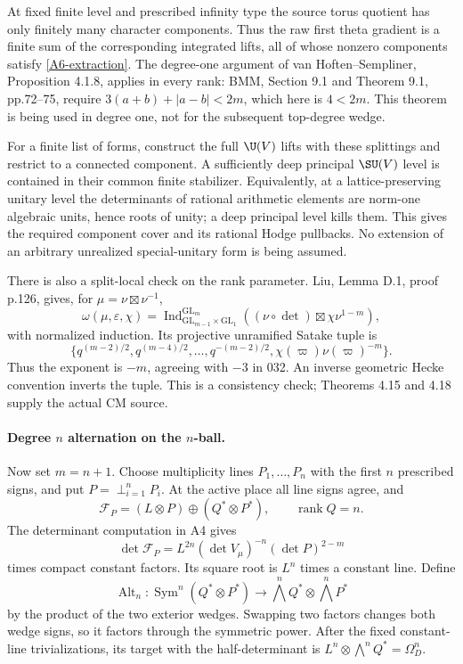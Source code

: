 At fixed finite level and prescribed infinity type the source
torus quotient has only finitely many character components.
Thus the raw first theta gradient is a finite sum of the corresponding
integrated lifts, all of whose nonzero components satisfy
\eqref{A6-extraction}. The degree-one argument of
van Hoften--Sempliner, Proposition 4.1.8, applies in every rank:
BMM, Section 9.1 and Theorem 9.1, pp.72--75, require
$3(a+b)+|a-b|<2m$, which here is $4<2m$. This theorem is being
used in degree one, not for the subsequent top-degree wedge.

For a finite list of forms, construct the full $\U(V)$ lifts with
these splittings and restrict to a connected component. A sufficiently
deep principal $\SU(V)$ level is contained in their common finite
stabilizer. Equivalently, at a lattice-preserving unitary level the
determinants of rational arithmetic elements are norm-one algebraic
units, hence roots of unity; a deep principal level kills them.
This gives the required component cover and its rational Hodge
pullbacks. No extension of an arbitrary unrealized special-unitary
form is being assumed.

There is also a split-local check on the rank parameter. Liu,
Lemma D.1, proof p.126, gives, for
$\mu=\nu\boxtimes\nu^{-1}$,
\[
 \omega(\mu,\varepsilon,\chi)
 =\operatorname{Ind}_{\mathrm{GL}_{m-1}\times\mathrm{GL}_1}
                       ^{\mathrm{GL}_m}
       ((\nu\circ\det)\boxtimes\chi\nu^{1-m}),
\]
with normalized induction. Its projective unramified Satake tuple is
\[
 \{q^{(m-2)/2},q^{(m-4)/2},\ldots,q^{-(m-2)/2},
                   \chi(\varpi)\nu(\varpi)^{-m}\}.
\]
Thus the exponent is $-m$, agreeing with $-3$ in 032. An inverse
geometric Hecke convention inverts the tuple. This is a consistency
check; Theorems 4.15 and 4.18 supply the actual CM source.

\paragraph{Degree $n$ alternation on the $n$-ball.}
Now set $m=n+1$. Choose multiplicity lines $P_1,\ldots,P_n$ with
the first $n$ prescribed signs, and put $P=\perp_{i=1}^nP_i$.
At the active place all line signs agree, and
\[
 \mathcal F_P=(L\otimes P)\oplus(Q^*\otimes P^*),
 \qquad \operatorname{rank}Q=n.
\]
The determinant computation in A4 gives
\[
 \det\mathcal F_P=L^{2n}(\det V_\mu)^{-n}(\det P)^{2-m}
\]
times compact constant factors. Its square root is $L^n$ times a
constant line. Define
\[
 \operatorname{Alt}_n:\operatorname{Sym}^n(Q^*\otimes P^*)
       \longrightarrow\bigwedge^nQ^*\otimes\bigwedge^nP^*
\]
by the product of the two exterior wedges. Swapping two factors
changes both wedge signs, so it factors through the symmetric power.
After the fixed constant-line trivializations, its target with the
half-determinant is
$L^n\otimes\bigwedge^nQ^*=\Omega_D^n$.

